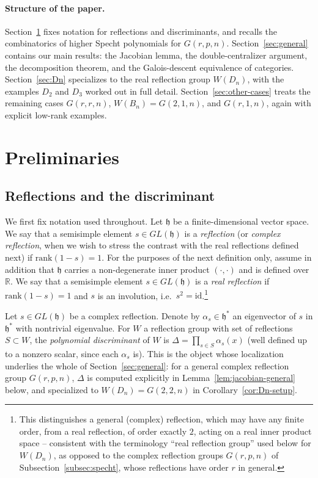 \documentclass[11pt,a4paper]{article}
\newcommand{\h}{\mathfrak{h}}
\begin{document}
\paragraph{Structure of the paper.} Section~\ref{sec:prelim} fixes
notation for reflections and discriminants, and recalls the
combinatorics of higher Specht polynomials for $G(r,p,n)$. Section~\ref{sec:general}
contains our main results: the Jacobian lemma, the double-centralizer
argument, the decomposition theorem, and the Galois-descent
equivalence of categories. Section~\ref{sec:Dn} specializes to the
real reflection group $W(D_n)$, with the examples $D_2$ and $D_3$
worked out in full detail. Section~\ref{sec:other-cases} treats the
remaining cases $G(r,r,n)$, $W(B_n) = G(2,1,n)$, and $G(r,1,n)$,
again with explicit low-rank examples.

\section{Preliminaries}\label{sec:prelim}

\subsection{Reflections and the discriminant}\label{subsec:notation}

We first fix notation used throughout. Let $\h$ be a finite-dimensional
vector space. We say that a semisimple element $s \in GL(\h)$ is a
\emph{reflection} (or \emph{complex reflection}, when we wish to
stress the contrast with the real reflections defined next) if
$\mathrm{rank}(1-s)=1$. For the purposes of the next definition only,
assume in addition that
$\h$ carries a non-degenerate inner product $(\cdot,\cdot)$ and is
defined over $\mathbb{R}$. We say that a semisimple element
$s \in GL(\h)$ is a \emph{real reflection} if $\mathrm{rank}(1-s)=1$
and $s$ is an involution, i.e.\ $s^2 = \mathrm{id}$.\footnote{\label{fn:real}This
distinguishes a general (complex) reflection, which may have any
finite order, from a real reflection, of order exactly $2$, acting on
a real inner product space -- consistent with the terminology
``real reflection group'' used below for $W(D_n)$, as opposed to the
complex reflection groups $G(r,p,n)$ of Subsection~\ref{subsec:specht},
whose reflections have order $r$ in general.}

Let $s \in GL(\h)$ be a complex reflection. Denote by
$\alpha_s \in \h^*$ an eigenvector of $s$ in $\h^*$ with nontrivial
eigenvalue. For $W$ a reflection group with set of reflections
$S \subset W$, the \emph{polynomial discriminant} of $W$ is
$\Delta = \prod_{s \in S} \alpha_s(x)$ (well defined up to a nonzero
scalar, since each $\alpha_s$ is). This is the object whose
localization underlies the whole of Section~\ref{sec:general}: for a
general complex reflection group $G(r,p,n)$, $\Delta$ is computed
explicitly in Lemma~\ref{lem:jacobian-general} below, and specialized
to $W(D_n) = G(2,2,n)$ in Corollary~\ref{cor:Dn-setup}.
\end{document}
